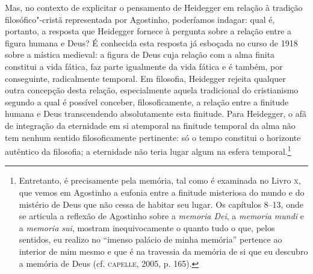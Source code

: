 Mas, no contexto de explicitar o pensamento de Heidegger em
relação à tradição filosófico"-cristã representada por Agostinho,
poderíamos indagar: qual é, portanto, a resposta que Heidegger
fornece à pergunta sobre a relação entre a figura humana e Deus?
É conhecida esta resposta já esboçada no curso de 1918 sobre a
mística medieval: a figura de Deus cuja relação com a alma
finita constitui a vida fática, faz parte igualmente da vida
fática e é também, por conseguinte, radicalmente temporal. Em
filosofia, Heidegger rejeita qualquer outra concepção desta
relação, especialmente aquela tradicional do cristianismo
segundo a qual é possível conceber, filosoficamente, a relação
entre a finitude humana e Deus transcendendo absolutamente esta
finitude. Para Heidegger, o afã de integração da eternidade em
si atemporal na finitude temporal da alma não tem nenhum sentido
filosoficamente pertinente: só o tempo constitui o horizonte
autêntico da filosofia; a eternidade não teria lugar algum na
esfera temporal.\footnote{   Entretanto, é precisamente pela
memória, tal como é examinada no Livro \textsc{x}, que vemos em Agostinho
a eufonia entre a finitude misteriosa do mundo e do mistério de
Deus que não cessa de habitar seu lugar. Os capítulos 8--13, onde
se articula a reflexão de Agostinho sobre a \emph{memoria
Dei}, a \emph{memoria mundi} e a \emph{memoria sui}, mostram
inequivocamente o quanto tudo o que, pelos sentidos, eu realizo
no ``imenso palácio de minha memória'' pertence ao interior de mim
mesmo e que é na travessia da memória de si que eu descubro a
memória de Deus (cf. \textsc{capelle}, 2005, p. 165).} 

